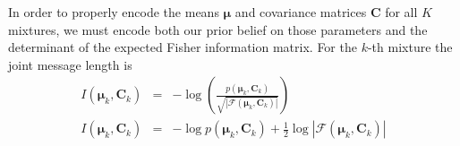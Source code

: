 \documentclass{elsarticle}
\newcommand{\vect}[1]{\boldsymbol{\mathbf{#1}}}
\def\veccov{\vect{C}}
\def\vecmean{\vect{\mu}}
\def\weight{w}
\def\weights{\vect{\weight}}
\newcommand{\fisher}[1]{\mathcal{F}\left(#1\right)}
\newcommand{\detfisher}[1]{\left|\fisher{#1}\right|}
\newcommand{\prior}[1]{p\left(#1\right)}
\begin{document}









In order to properly encode the means $\vecmean$ and covariance matrices
$\veccov$ for all $K$ mixtures, we must encode both our prior belief on 
those parameters and the determinant of the expected Fisher information 
matrix. For the $k$-th mixture the joint message length is
\begin{eqnarray}
  I(\vecmean_k,\veccov_k) &=& -\log{\left(\frac{\prior{{\vecmean_k,\veccov_k}}}{\sqrt{\detfisher{{\vecmean_k,\veccov_k}}}}\right)} \nonumber \\ 
  I(\vecmean_k,\veccov_k) &=& -\log{\prior{{\vecmean_k,\veccov_k}}} + \frac{1}{2}\log{\detfisher{{\vecmean_k,\veccov_k}}}
\end{eqnarray}
\end{document}
